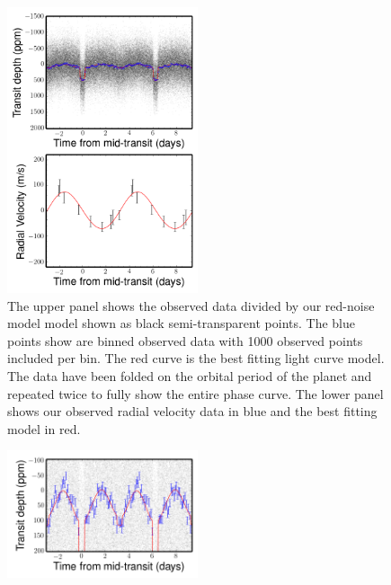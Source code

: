 \documentclass[apjl]{emulateapj}
\begin{document}
\begin{figure}
\includegraphics[width=0.50\textwidth]{koi2133.png}
\caption{The upper panel shows the observed data divided by our red-noise model model shown as black semi-transparent points. The blue points show are binned observed data with 1000 observed points included per bin. The red curve is the best fitting light curve model. The data have been folded on the orbital period of the planet and repeated twice to fully show the entire phase curve. The lower panel shows our observed radial velocity data in blue and the best fitting model in red.}
\label{fig:results}
\end{figure}

\begin{figure}
\includegraphics[width=0.50\textwidth]{koi2133_zoom.png}
\caption{}
\label{fig:results_zoom}
\end{figure}
\end{document}
